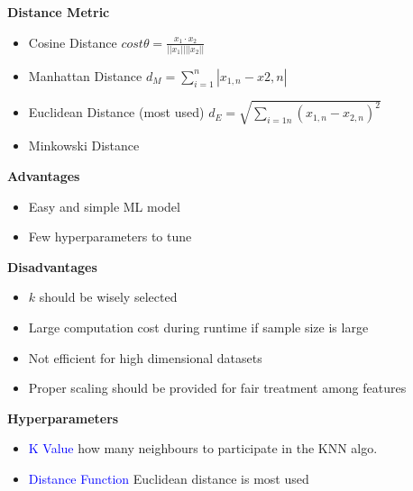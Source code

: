 \textbf{Distance Metric}
\begin{itemize}
    \item Cosine Distance $cost \theta = \frac{x_1 \cdot x_2}{||x_1|| ||x_2||}$
    \item Manhattan Distance $d_M = \sum_{i=1}^{n}| x_{1,n} - x{2,n} |$
    \item Euclidean Distance (most used) $d_E = \sqrt{\sum_{i=1n}^{}(x_{1,n} - x_{2,n})^2}$
    \item Minkowski Distance
\end{itemize}
\textbf{Advantages}
\begin{itemize}
    \item Easy and simple ML model
    \item Few hyperparameters to tune
\end{itemize}

\textbf{Disadvantages}
\begin{itemize}
    \item $k$ should be wisely selected
    \item Large computation cost during runtime if sample size is large
    \item Not efficient for high dimensional datasets
    \item Proper scaling should be provided for fair treatment among features
\end{itemize}

\textbf{Hyperparameters}
\begin{itemize}
    \item \textcolor{blue}{K Value} how many neighbours to participate in the KNN algo.
    \item \textcolor{blue}{Distance Function} Euclidean distance is most used
\end{itemize}
